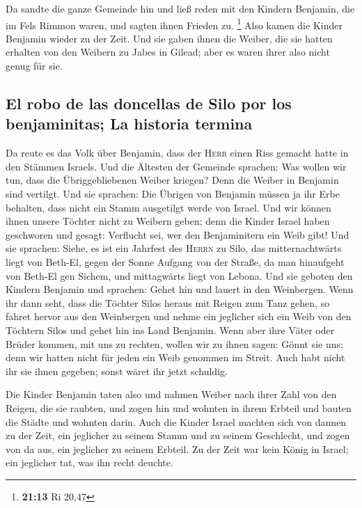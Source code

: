  Da sandte die ganze Gemeinde hin und ließ reden mit den
Kindern Benjamin, die im Fels Rimmon waren, und sagten ihnen Frieden zu.
\footnote{\textbf{21:13} Ri 20,47}  Also kamen die Kinder
Benjamin wieder zu der Zeit. Und sie gaben ihnen die Weiber, die sie
hatten erhalten von den Weibern zu Jabes in Gilead; aber es waren ihrer
also nicht genug für sie.

\hypertarget{el-robo-de-las-doncellas-de-silo-por-los-benjaminitas-la-historia-termina}{%
\subsection{El robo de las doncellas de Silo por los benjaminitas; La
historia
termina}\label{el-robo-de-las-doncellas-de-silo-por-los-benjaminitas-la-historia-termina}}

 Da reute es das Volk über Benjamin, dass der
\textsc{Herr} einen Riss gemacht hatte in den Stämmen Israels.
 Und die Ältesten der Gemeinde sprachen: Was wollen wir
tun, dass die Übriggebliebenen Weiber kriegen? Denn die Weiber in
Benjamin sind vertilgt.  Und sie sprachen: Die Übrigen
von Benjamin müssen ja ihr Erbe behalten, dass nicht ein Stamm
ausgetilgt werde von Israel.  Und wir können ihnen unsere
Töchter nicht zu Weibern geben; denn die Kinder Israel haben geschworen
und gesagt: Verflucht sei, wer den Benjaminitern ein Weib gibt!
 Und sie sprachen: Siehe, es ist ein Jahrfest des
\textsc{Herrn} zu Silo, das mitternachtwärts liegt von Beth-El, gegen
der Sonne Aufgang von der Straße, da man hinaufgeht von Beth-El gen
Sichem, und mittagwärts liegt von Lebona.  Und sie
geboten den Kindern Benjamin und sprachen: Gehet hin und lauert in den
Weinbergen.  Wenn ihr dann seht, dass die Töchter Silos
heraus mit Reigen zum Tanz gehen, so fahret hervor aus den Weinbergen
und nehme ein jeglicher sich ein Weib von den Töchtern Silos und gehet
hin ins Land Benjamin.  Wenn aber ihre Väter oder Brüder
kommen, mit uns zu rechten, wollen wir zu ihnen sagen: Gönnt sie uns;
denn wir hatten nicht für jeden ein Weib genommen im Streit. Auch habt
nicht ihr sie ihnen gegeben; sonst wäret ihr jetzt schuldig.

 Die Kinder Benjamin taten also und nahmen Weiber nach
ihrer Zahl von den Reigen, die sie raubten, und zogen hin und wohnten in
ihrem Erbteil und bauten die Städte und wohnten darin. 
Auch die Kinder Israel machten sich von dannen zu der Zeit, ein
jeglicher zu seinem Stamm und zu seinem Geschlecht, und zogen von da
aus, ein jeglicher zu seinem Erbteil.  Zu der Zeit war
kein König in Israel; ein jeglicher tat, was ihn recht deuchte.

